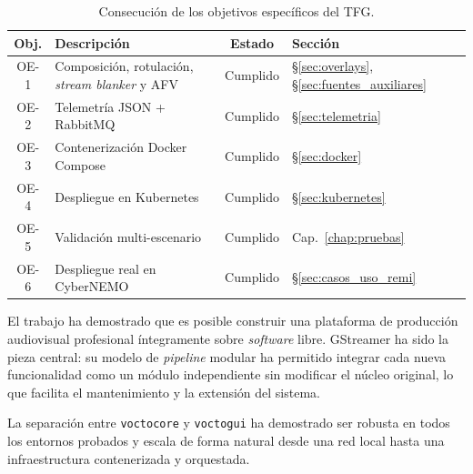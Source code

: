 \begin{table}[H]
  \centering
  \small
  \caption{Consecución de los objetivos específicos del TFG.}
  \label{tab:objetivos_cumplidos}
  \begin{tabular}{|c|p{5.5cm}|c|p{3.2cm}|}
    \hline
    \textbf{Obj.} & \textbf{Descripción} & \textbf{Estado} & \textbf{Sección} \\
    \hline
    OE-1 & Composición, rotulación, \textit{stream blanker} y AFV & Cumplido & \S\ref{sec:overlays}, \S\ref{sec:fuentes_auxiliares} \\
    OE-2 & Telemetría JSON + RabbitMQ        & Cumplido & \S\ref{sec:telemetria} \\
    OE-3 & Contenerización Docker Compose    & Cumplido & \S\ref{sec:docker} \\
    OE-4 & Despliegue en Kubernetes          & Cumplido & \S\ref{sec:kubernetes} \\
    OE-5 & Validación multi-escenario        & Cumplido & Cap.~\ref{chap:pruebas} \\
    OE-6 & Despliegue real en CyberNEMO      & Cumplido & \S\ref{sec:casos_uso_remi} \\
    \hline
  \end{tabular}
\end{table}

\vspace{0.3cm}

El trabajo ha demostrado que es posible construir una plataforma de producción
audiovisual profesional íntegramente sobre \textit{software} libre. GStreamer ha sido la pieza
central: su modelo de \textit{pipeline} modular ha permitido integrar cada nueva
funcionalidad como un módulo independiente sin modificar el núcleo original, lo que
facilita el mantenimiento y la extensión del sistema.

La separación entre \texttt{voctocore} y \texttt{voctogui} ha demostrado ser robusta
en todos los entornos probados y escala de forma natural desde una red local hasta
una infraestructura contenerizada y orquestada.
